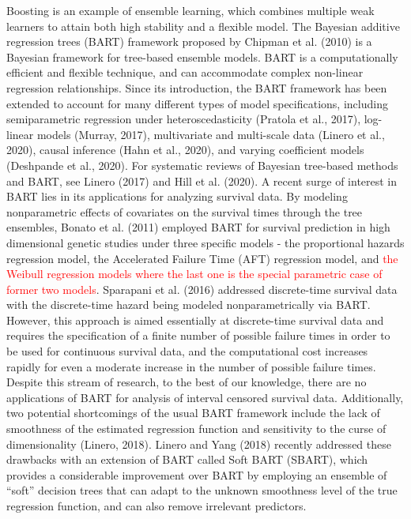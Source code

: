 \documentclass[11pt]{article}
\begin{document}
Boosting is an example of ensemble learning, which combines multiple weak learners to attain both high stability and a flexible model. The Bayesian additive regression trees (BART) framework proposed by Chipman et al. (2010) is a Bayesian framework for tree-based ensemble models. BART is a computationally efficient and flexible technique, and can accommodate complex non-linear regression relationships. Since its introduction, the BART framework has been extended to account for many different types of model specifications, including semiparametric regression under heteroscedasticity (Pratola et al., 2017), log-linear models (Murray, 2017), multivariate and multi-scale data (Linero et al., 2020), causal inference (Hahn et al., 2020), and varying coefficient models (Deshpande et al., 2020). For systematic reviews of Bayesian tree-based methods and BART, see Linero (2017) and Hill et al. (2020). A recent surge of interest in BART lies in its applications for analyzing survival data. By modeling nonparametric effects of covariates on the survival times through the tree ensembles, Bonato et al. (2011) employed BART for survival prediction in high dimensional genetic studies under three specific models - the proportional hazards regression model, the Accelerated Failure Time (AFT) regression model, and \textcolor{red}{the Weibull regression models where the last one is the special parametric case of former two models}. Sparapani et al. (2016) addressed discrete-time survival data with the discrete-time hazard being modeled nonparametrically via BART. However, this approach is aimed essentially at discrete-time survival data and requires the specification of a finite number of possible failure times in order to be used for continuous survival data, and the computational cost increases rapidly for even a moderate increase in the number of possible failure times. Despite this stream of research, to the best of our knowledge, there are no applications of BART for analysis of interval censored survival data. Additionally, two potential shortcomings of the usual BART framework include the lack of smoothness of the estimated regression function and sensitivity to the curse of dimensionality (Linero, 2018). Linero and Yang (2018) recently addressed these drawbacks with an extension of BART called Soft BART (SBART), which provides a considerable improvement over BART by employing an ensemble of ``soft'' decision trees that can adapt to the unknown smoothness level of the true regression function, and can also remove irrelevant predictors.
\end{document}

